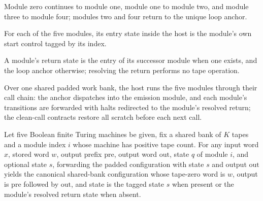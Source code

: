 \begin{definition}
\label{Complexity.clA5HostNext}
\leanok
Module zero continues to module one, module one to module two, and module three to module four; modules two and four return to the unique loop anchor.
\end{definition}

\begin{definition}
\label{Complexity.clA5HostEntry}
\leanok
{}
For each of the five modules, its entry state inside the host is the module's own start control tagged by its index.
\end{definition}

\begin{definition}
\label{Complexity.clA5HostRet}
\leanok
{}
A module's return state is the entry of its successor module when one exists, and the loop anchor otherwise; resolving the return performs no tape operation.
\end{definition}

\begin{definition}
\label{Complexity.clA5HostTM}
\leanok
{}
Over one shared padded work bank, the host runs the five modules through their call chain: the anchor dispatches into the emission module, and each module's transitions are forwarded with halts redirected to the module's resolved return; the clean-call contracts restore all scratch before each next call.
\end{definition}

\begin{lemma}
\label{Complexity.clA5Host_seam}
\leanok
{}
Let five Boolean finite Turing machines be given, fix a shared bank of $K$ tapes and a
module index $i$ whose machine has positive tape count. For any input word $x$, stored
word $w$, output prefix $\mathrm{pre}$, output word $\mathrm{out}$, state $q$ of module
$i$, and optional state $s$, forwarding the padded configuration with state $s$ and
output $\mathrm{out}$ yields the canonical shared-bank configuration whose tape-zero
word is $w$, output is $\mathrm{pre}$ followed by $\mathrm{out}$, and state is the
tagged state $s$ when present or the module's resolved return state when absent.
\end{lemma}

